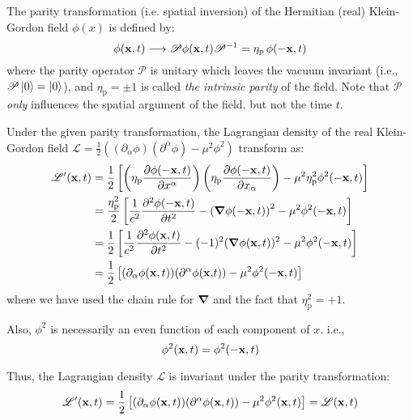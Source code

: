 \documentclass[letterpaper,12pt]{article}
\newenvironment{problem}{\subsection{}\begin{adjustwidth}{0.25in}{}\vspace{-\baselineskip}}{\end{adjustwidth}}
\newcommand{\pder}[2]{\frac{\partial #1}{\partial #2}}
\newcommand{\npder}[3]{\frac{\partial^#1 #2}{\partial #3^#1}}
\newcommand{\lagr}{\mathscr{L}}
\begin{document}
\begin{problem}
The parity transformation (i.e. spatial inversion) of the Hermitian (real) Klein-Gordon field $\phi(x)$ is defined by:
\begin{equation*}
	\phi(\vb{x},t) \longrightarrow \mathscr{P}\phi(\vb{x},t)\mathscr{P}^{-1} = \eta_\text{p} \, \phi(-\vb{x},t)
\end{equation*}
where the parity operator $\mathscr{P}$ is unitary which leaves the vacuum invariant (i.e., $\mathscr{P}\ket{0} = \ket{0}$), and $\eta_\text{p} = \pm1$ is called \emph{the intrinsic parity} of the field. Note that $\mathscr{P}$ \emph{only} influences the spatial argument of the field, but not the time $t$.

Under the given parity transformation, the Lagrangian density of the real Klein-Gordon field $\lagr = \frac{1}{2} \left((\partial_\alpha \phi)(\partial^\alpha \phi) - \mu^2\phi^2\right)$ transform as:
\begin{align*}
	\lagr'(\vb{x},t) &= \frac{1}{2} \left[\left(\eta_\text{p}\pder{\phi(-\vb{x},t)}{x^\alpha}\right)\left(\eta_\text{p}\pder{\phi(-\vb{x},t)}{x_\alpha}\right) - \mu^2 \eta_\text{p}^2 \phi^2(-\vb{x},t) \right]	\\
	&= \frac{\eta_\text{p}^2}{2}\left[\frac{1}{c^2}\npder{2}{\phi(-\vb{x},t)}{t} - \left(\grad{\phi(-\vb{x},t)}\right)^2 - \mu^2\phi^2(-\vb{x},t)\right]	\\
	&= \frac{1}{2} \left[\frac{1}{c^2}\npder{2}{\phi(\vb{x},t)}{t} - (-1)^2(\grad{\phi(\vb{x},t)})^2 - \mu^2\phi^2(-\vb{x},t)\right]	\\
	&= \frac{1}{2} \left[(\partial_\alpha \phi(\vb{x},t))(\partial^\alpha \phi(\vb{x,}t)) - \mu^2\phi^2(-\vb{x},t)\right]
\end{align*}
where we have used the chain rule for $\grad$ and the fact that $\eta_\text{p}^2=+1$.

Also, $\phi^2$ is necessarily an even function of each component of $x$. i.e.,
\begin{equation*}
	\phi^2(\vb{x},t) = \phi^2(-\vb{x},t)
\end{equation*}

Thus, the Lagrangian density $\lagr$ is invariant under the parity transformation:
\begin{equation*}
	\lagr'(\vb{x},t) = \frac{1}{2}\left[(\partial_\alpha \phi(\vb{x},t))(\partial^\alpha \phi(\vb{x},t)) - \mu^2\phi^2(\vb{x},t)\right] = \lagr(\vb{x},t)		 
\end{equation*}


\end{problem}
\end{document}
